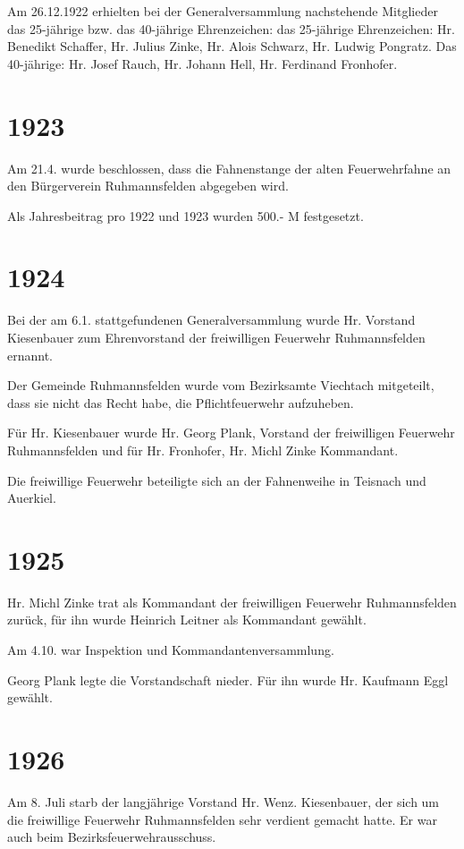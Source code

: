 \documentclass[12pt,a4paper]{book}
\begin{document}
Am 26.12.1922 erhielten bei der Generalversammlung nachstehende Mitglieder das
25-jährige bzw. das 40-jährige Ehrenzeichen: das 25-jährige Ehrenzeichen: Hr.
Benedikt Schaffer, Hr. Julius Zinke, Hr. Alois Schwarz, Hr. Ludwig Pongratz. Das
40-jährige: Hr. Josef Rauch, Hr. Johann Hell, Hr. Ferdinand Fronhofer.

\section*{1923}

Am 21.4. wurde beschlossen, dass die Fahnenstange der alten Feuerwehrfahne an
den Bürgerverein Ruhmannsfelden abgegeben wird.

Als Jahresbeitrag pro 1922 und 1923 wurden 500.- M festgesetzt.

\section*{1924}

Bei der am 6.1. stattgefundenen Generalversammlung wurde Hr. Vorstand
Kiesenbauer zum Ehrenvorstand der freiwilligen Feuerwehr Ruhmannsfelden ernannt.

Der Gemeinde Ruhmannsfelden wurde vom Bezirksamte Viechtach mitgeteilt, dass sie
nicht das Recht habe, die Pflichtfeuerwehr aufzuheben.

Für Hr. Kiesenbauer wurde Hr. Georg Plank, Vorstand der freiwilligen Feuerwehr
Ruhmannsfelden und für Hr. Fronhofer, Hr. Michl Zinke Kommandant.

Die freiwillige Feuerwehr beteiligte sich an der Fahnenweihe in Teisnach und
Auerkiel.

\section*{1925}

Hr. Michl Zinke trat als Kommandant der freiwilligen Feuerwehr Ruhmannsfelden
zurück, für ihn wurde Heinrich Leitner als Kommandant gewählt.

Am 4.10. war Inspektion und Kommandantenversammlung.

Georg Plank legte die Vorstandschaft nieder. Für ihn wurde Hr. Kaufmann Eggl
gewählt.

\section*{1926}

Am 8. Juli starb der langjährige Vorstand Hr. Wenz. Kiesenbauer, der sich um die
freiwillige Feuerwehr Ruhmannsfelden sehr verdient gemacht hatte. Er war auch
beim Bezirksfeuerwehrausschuss.
\end{document}
